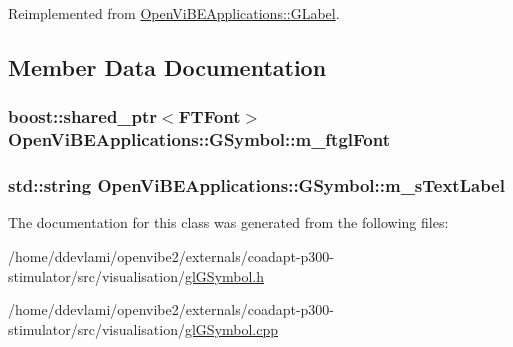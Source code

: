 Reimplemented from \hyperlink{classOpenViBEApplications_1_1GLabel_a562a8811832fa57cd0b5ae48467ed687}{OpenViBEApplications::GLabel}.



\subsection{Member Data Documentation}
\hypertarget{classOpenViBEApplications_1_1GSymbol_a3d8dc4f93343e955b77f6a8a3e923fd3}{
\subsubsection[{m\_\-ftglFont}]{\setlength{\rightskip}{0pt plus 5cm}boost::shared\_\-ptr$<$FTFont$>$ {\bf OpenViBEApplications::GSymbol::m\_\-ftglFont}}}
\label{classOpenViBEApplications_1_1GSymbol_a3d8dc4f93343e955b77f6a8a3e923fd3}
\hypertarget{classOpenViBEApplications_1_1GSymbol_af901c52795dac9bbe644eb7fa58664be}{
\subsubsection[{m\_\-sTextLabel}]{\setlength{\rightskip}{0pt plus 5cm}std::string {\bf OpenViBEApplications::GSymbol::m\_\-sTextLabel}}}
\label{classOpenViBEApplications_1_1GSymbol_af901c52795dac9bbe644eb7fa58664be}


The documentation for this class was generated from the following files:\begin{DoxyCompactItemize}
\item 
/home/ddevlami/openvibe2/externals/coadapt-\/p300-\/stimulator/src/visualisation/\hyperlink{glGSymbol_8h}{glGSymbol.h}\item 
/home/ddevlami/openvibe2/externals/coadapt-\/p300-\/stimulator/src/visualisation/\hyperlink{glGSymbol_8cpp}{glGSymbol.cpp}\end{DoxyCompactItemize}
